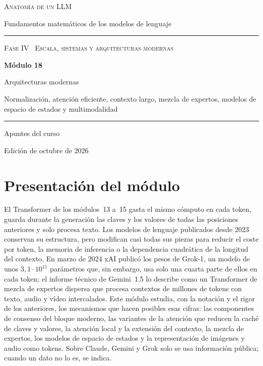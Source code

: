 \documentclass[11pt,a4paper,twoside,openany]{book}
\begin{document}
\frontmatter
\begin{titlepage}
\centering
\vspace*{2.5cm}
{\large\scshape Anatomía de un LLM}\par
\vspace{0.4cm}
{\normalsize Fundamentos matemáticos de los modelos de lenguaje}\par
\vspace{2.2cm}
\rule{\textwidth}{0.8pt}\par\vspace{0.5cm}
{\small\scshape Fase IV \textperiodcentered\ Escala, sistemas y arquitecturas modernas}\par\vspace{0.3cm}
{\Huge\bfseries Módulo 18\par}\vspace{0.3cm}
{\LARGE Arquitecturas modernas\par}
\vspace{0.2cm}
{\large Normalización, atención eficiente, contexto largo, mezcla de expertos, modelos de espacio de estados y multimodalidad\par}
\vspace{0.5cm}\rule{\textwidth}{0.4pt}\par
\vspace{1.6cm}
{\large Apuntes del curso}\par
\vfill
{\small Edición de octubre de 2026}\par
\end{titlepage}

\chapter*{Presentación del módulo}

El Transformer de los módulos~13 a~15 gasta el mismo cómputo en cada token, guarda durante la generación las claves y los valores de todas las posiciones anteriores y solo procesa texto. Los modelos de lenguaje publicados desde 2023 conservan su estructura, pero modifican casi todas sus piezas para reducir el coste por token, la memoria de inferencia o la dependencia cuadrática de la longitud del contexto. En marzo de 2024 xAI publicó los pesos de Grok-1, un modelo de unos $3{,}1\cdot 10^{11}$ parámetros que, sin embargo, usa solo una cuarta parte de ellos en cada token; el informe técnico de Gemini~1.5 lo describe como un Transformer de mezcla de expertos dispersa que procesa contextos de millones de tokens con texto, audio y vídeo intercalados. Este módulo estudia, con la notación y el rigor de los anteriores, los mecanismos que hacen posibles esas cifras: las componentes de consenso del bloque moderno, las variantes de la atención que reducen la caché de claves y valores, la atención local y la extensión del contexto, la mezcla de expertos, los modelos de espacio de estados y la representación de imágenes y audio como tokens. Sobre Claude, Gemini y Grok solo se usa información pública; cuando un dato no lo es, se indica.
\end{document}
